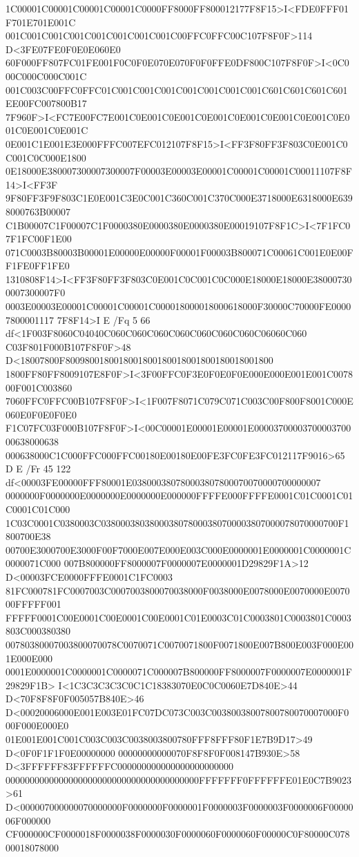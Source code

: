 1C00001C00001C00001C00001C0000FF8000FF800012177F8F15>I<FDE0FFF01F701E701E001C
001C001C001C001C001C001C001C001C00FFC0FFC00C107F8F0F>114 D<3FE07FE0F0E0E060E0
60F000FF807FC01FE001F0C0F0E070E070F0F0FFE0DF800C107F8F0F>I<0C000C000C000C001C
001C003C00FFC0FFC01C001C001C001C001C001C001C001C601C601C601C601EE00FC007800B17
7F960F>I<FC7E00FC7E001C0E001C0E001C0E001C0E001C0E001C0E001C0E001C0E001C0E001C
0E001C1E001E3E000FFFC007EFC012107F8F15>I<FF3F80FF3F803C0E001C0C001C0C000E1800
0E18000E380007300007300007F00003E00003E00001C00001C00001C00011107F8F14>I<FF3F
9F80FF3F9F803C1E0E001C3E0C001C360C001C370C000E3718000E6318000E6398000763B00007
C1B00007C1F00007C1F0000380E0000380E0000380E00019107F8F1C>I<7F1FC07F1FC00F1E00
071C0003B80003B00001E00000E00000F00001F00003B800071C00061C001E0E00FF1FE0FF1FE0
1310808F14>I<FF3F80FF3F803C0E001C0C001C0C000E18000E18000E380007300007300007F0
0003E00003E00001C00001C00001C000018000018000618000F30000C70000FE00007800001117
7F8F14>I E /Fq 5 66 df<1F003F8060C04040C060C060C060C060C060C060C060C06060C060
C03F801F000B107F8F0F>48 D<18007800F8009800180018001800180018001800180018001800
1800FF80FF8009107E8F0F>I<3F00FFC0F3E0F0E0F0E000E000E001E001C007800F001C003860
7060FFC0FFC00B107F8F0F>I<1F007F8071C079C071C003C00F800F8001C000E060E0F0E0F0E0
F1C07FC03F000B107F8F0F>I<00C00001E00001E00001E0000370000370000370000638000638
000638000C1C000FFC000FFC00180E00180E00FE3FC0FE3FC012117F9016>65
D E /Fr 45 122 df<00003FE00000FFF80001E038000380780003807800070070000700000007
0000000F0000000E0000000E0000000E000000FFFFE000FFFFE0001C01C0001C01C0001C01C000
1C03C0001C0380003C0380003803800038078000380700003807000078070000700F1800700E38
00700E3000700E3000F00F7000E007E000E003C000E0000001E0000001C0000001C0000071C000
007B800000FF8000007F0000007E0000001D29829F1A>12 D<00003FCE0000FFFE0001C1FC0003
81FC000781FC0007003C0007003800070038000F0038000E0078000E0070000E007000FFFFF001
FFFFF0001C00E0001C00E0001C00E0001C01E0003C01C0003801C0003801C0003803C000380380
00780380007003800070078C0070071C0070071800F0071800E007B800E003F000E001E000E000
0001E0000001C0000001C0000071C000007B800000FF8000007F0000007E0000001F29829F1B>
I<1C3C3C3C3C0C1C18383070E0C0C0060E7D840E>44 D<70F8F8F0F005057B840E>46
D<00020006000E001E003E01FC07DC073C003C00380038007800780070007000F000F000E000E0
01E001E001C001C003C003C0038003800780FFF8FFF80F1E7B9D17>49 D<0F0F1F1F0E00000000
00000000000070F8F8F0F008147B930E>58 D<3FFFFFF83FFFFFFC000000000000000000000000
0000000000000000000000000000000000000000FFFFFFF0FFFFFFE01E0C7B9023>61
D<000007000000070000000F0000000F0000001F0000003F0000003F0000006F0000006F000000
CF000000CF0000018F0000038F0000030F0000060F0000060F00000C0F80000C07800018078000
